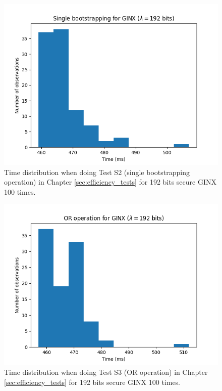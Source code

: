 \begin{figure}[ht]
    \centering
    \includegraphics[width=0.8\linewidth]{data/figures/GINX_STD192_Single_bootstrapping.png}
    \caption{Time distribution when doing Test S2 (single bootstrapping operation) in Chapter \ref{sec:efficiency_tests} for 192 bits secure GINX 100 times.}
    \label{fig:distr_ginx192_bs}
\end{figure}

\begin{figure}[ht]
    \centering
    \includegraphics[width=0.8\linewidth]{data/figures/GINX_STD192_OR_operation.png}
    \caption{Time distribution when doing Test S3 (OR operation) in Chapter \ref{sec:efficiency_tests} for 192 bits secure GINX 100 times.}
    \label{fig:distr_ginx192_or}
\end{figure}

